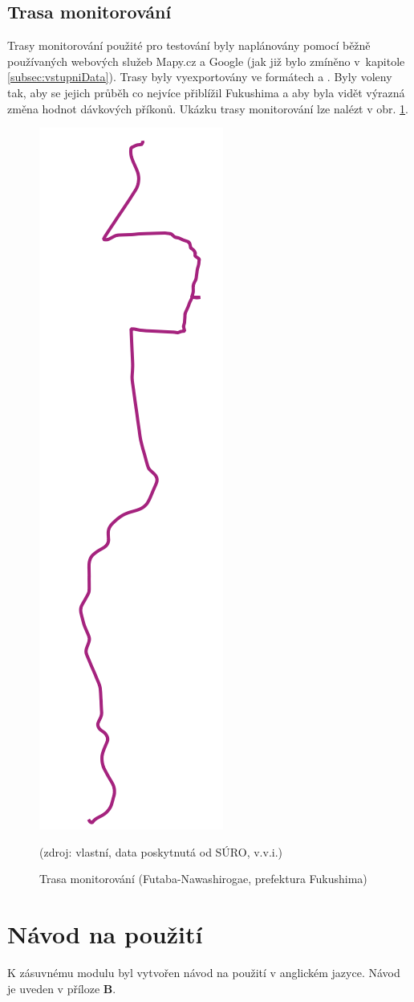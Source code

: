 \subsection{Trasa monitorování} Trasy monitorování použité pro
testování byly naplánovány pomocí běžně používaných webových služeb
Mapy.cz a Google (jak již bylo zmíněno v~kapitole
\ref{subsec:vstupniData}). Trasy byly vyexportovány ve formátech
 a . Byly voleny tak, aby se jejich průběh co nejvíce
přiblížil  Fukushima a aby byla vidět výrazná změna hodnot
dávkových příkonů. Ukázku trasy monitorování lze nalézt v obr. \ref{fig:trasa}.
\newpage
\begin{figure}[H] \centering
    \includegraphics[scale=0.3]{./pictures/trasa_monitorovani.png}
      	\caption[Trasa monitorování (Futaba-Nawashirogae, prefektura
Fukushima)]{Trasa monitorování (Futaba-Nawashirogae, prefektura
Fukushima)}(zdroj: vlastní, data poskytnutá od SÚRO, v.v.i.)
    	\label{fig:trasa}
\end{figure}



\section{Návod na použití}
K zásuvnému modulu byl vytvořen návod na použití v anglickém jazyce. 
Návod je uveden v příloze \textbf{B}. 